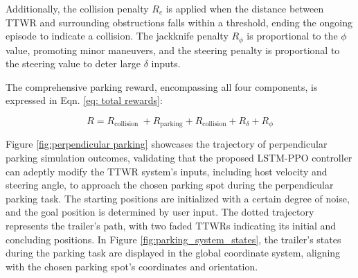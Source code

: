 Additionally, the collision penalty $R_c$ is applied when the distance between TTWR and surrounding obstructions falls within a threshold, ending the ongoing episode to indicate a collision. The jackknife penalty $R_{\phi}$ is proportional to the $\phi$ value, promoting minor maneuvers, and the steering penalty is proportional to the steering value to deter large $\delta$ inputs.

The comprehensive parking reward, encompassing all four components, is expressed in Eqn. \ref{eq: total rewards}:

\begin{equation}
R=R_{\text{collision }} + R_{\text{parking}} + R_{\text{collision}} + R_{\delta} + R_{\phi}
\label{eq: total rewards}\end{equation}

Figure \ref{fig:perpendicular parking} showcases the trajectory of perpendicular parking simulation outcomes, validating that the proposed LSTM-PPO controller can adeptly modify the TTWR system's inputs, including host velocity and steering angle, to approach the chosen parking spot during the perpendicular parking task. The starting positions are initialized with a certain degree of noise, and the goal position is determined by user input. The dotted trajectory represents the trailer's path, with two faded TTWRs indicating its initial and concluding positions. In Figure \ref{fig:parking_system_states}, the trailer's states during the parking task are displayed in the global coordinate system, aligning with the chosen parking spot's coordinates and orientation.


